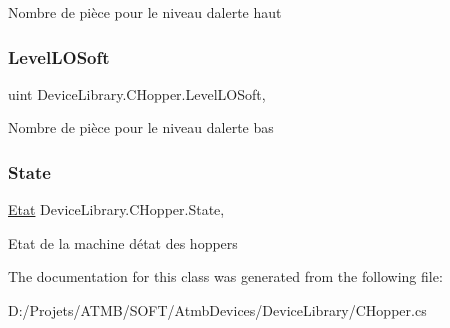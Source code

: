 Nombre de pièce pour le niveau d\textquotesingle{}alerte haut 

\mbox{\label{class_device_library_1_1_c_hopper_a27713aed4b5a8f43ec2998ddec6ad5f2}} 
\subsubsection{\texorpdfstring{Level\+L\+O\+Soft}{LevelLOSoft}}
{\footnotesize\ttfamily uint Device\+Library.\+C\+Hopper.\+Level\+L\+O\+Soft\hspace{0.3cm}{\ttfamily [get]}, {\ttfamily [set]}}



Nombre de pièce pour le niveau d\textquotesingle{}alerte bas 

\mbox{\label{class_device_library_1_1_c_hopper_aa9f1e8689d187df5894527e7c02dc875}} 
\subsubsection{\texorpdfstring{State}{State}}
{\footnotesize\ttfamily \mbox{\hyperlink{class_device_library_1_1_c_hopper_a5f54d84c3b2a93420c8ff69b1351c77a}{Etat}} Device\+Library.\+C\+Hopper.\+State\hspace{0.3cm}{\ttfamily [get]}, {\ttfamily [set]}}



Etat de la machine d\textquotesingle{}état des hoppers 



The documentation for this class was generated from the following file\+:\begin{DoxyCompactItemize}
\item 
D\+:/\+Projets/\+A\+T\+M\+B/\+S\+O\+F\+T/\+Atmb\+Devices/\+Device\+Library/C\+Hopper.\+cs\end{DoxyCompactItemize}
